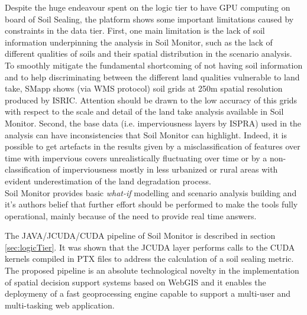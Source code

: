 \documentclass[APA,LATO1COL,doublespace]{WileyNJD-v2}
\newcommand{\toberevised}[1]{\emph{\textcolor{red}{#1}}} %
\begin{document}
Despite the huge endeavour spent on the logic tier to have GPU computing on board of Soil Sealing, the platform shows some important limitations caused by constraints in the data tier.
First, one main limitation is the lack of soil information underpinning the analysis in Soil Monitor, such as the lack of different qualities of soils and their spatial distribution in the scenario analysis.
To smoothly mitigate the fundamental shortcoming of not having soil information and to help discriminating between the different land qualities vulnerable to land take, SMapp shows (via WMS protocol) soil grids at 250m spatial resolution produced by ISRIC.
Attention should be drawn to the low accuracy of this grids with respect to the scale and detail of the land take analysis available in Soil Monitor.
Second, the base data (i.e. imperviousness layers by ISPRA) used in the analysis can have inconsistencies that Soil Monitor can highlight.
Indeed, it is possible to get artefacts in the results given by a misclassification of features over time with impervious covers unrealistically fluctuating over time or by a non-classification of imperviousness mostly in less urbanized or rural areas with evident underestimation of the land degradation process.\\
Soil Monitor provides basic \textit{what-if} modelling and scenario analysis building and it's authors belief that further effort should be performed to make the tools fully operational, mainly because of the need to provide real time answers.

The JAVA/JCUDA/CUDA pipeline of Soil Monitor is described in section \ref{sec:logicTier}.
It was shown that the JCUDA layer performs calls to the CUDA kernels compiled in PTX files to address the calculation of a soil sealing metric.
The proposed pipeline is an absolute technological novelty in the implementation of spatial decision support systems based on WebGIS and it enables the deploymeny of a fast geoprocessing engine capable to support a multi-user and multi-tasking web application.
\end{document}
